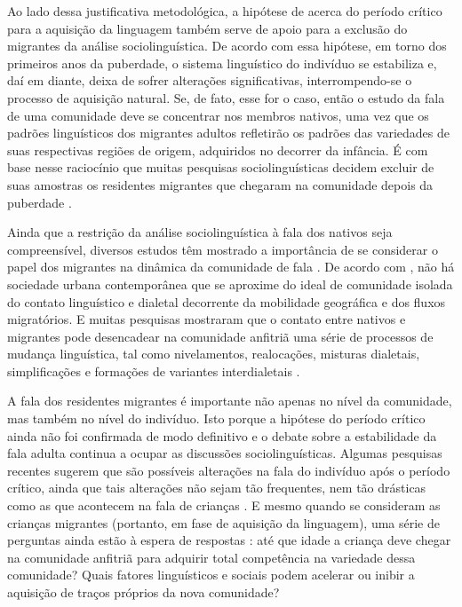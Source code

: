 \documentclass[
    a4paper,	%
    12pt,	%
    ]{article}	%
\begin{document}
Ao lado dessa justificativa metodológica, a hipótese de \citet{Lenneberg1967}
acerca do período crítico para a aquisição da linguagem também serve de apoio
para a exclusão do migrantes da análise sociolinguística. De acordo com essa
hipótese, em torno dos primeiros anos da puberdade, o sistema linguístico do
indivíduo se estabiliza e, daí em diante, deixa de sofrer alterações
significativas, interrompendo-se o processo de aquisição natural. Se, de fato,
esse for o caso, então o estudo da fala de uma comunidade deve se concentrar nos
membros nativos, uma vez que os padrões linguísticos dos migrantes adultos
refletirão os padrões das variedades de suas respectivas regiões de origem,
adquiridos no decorrer da infância. É com base nesse raciocínio que muitas
pesquisas sociolinguísticas decidem excluir de suas amostras os residentes
migrantes que chegaram na comunidade depois da puberdade \citep[p. ex.][p.
111]{Labov1966}.

Ainda que a restrição da análise sociolinguística à fala dos nativos seja
compreensível, diversos estudos têm mostrado a importância de se considerar o
papel dos migrantes na dinâmica da comunidade de fala \citep{Britain2018,
Bortoni-Ricardo2011, Trudgill1986}. De acordo com \citet{Milroy2002}, não há
sociedade urbana contemporânea que se aproxime do ideal de comunidade isolada do
contato linguístico e dialetal decorrente da mobilidade geográfica e dos fluxos
migratórios. E muitas pesquisas mostraram que o contato entre nativos e
migrantes pode desencadear na comunidade anfitriã uma série de processos de
mudança linguística, tal como nivelamentos, realocações, misturas dialetais,
simplificações e formações de variantes interdialetais \citep{Trudgill1986}.

A fala dos residentes migrantes é importante não apenas no nível da comunidade,
mas também no nível do indivíduo. Isto porque a hipótese do período crítico
\citep{Lenneberg1967} ainda não foi confirmada de modo definitivo e o debate
sobre a estabilidade da fala adulta continua a ocupar as discussões
sociolinguísticas. Algumas pesquisas recentes sugerem que são possíveis
alterações na fala do indivíduo após o período crítico, ainda que tais
alterações não sejam tão frequentes, nem tão drásticas como as que acontecem na
fala de crianças \citep{Cukor-Avila.Bailey2013}. E mesmo quando se consideram as
crianças migrantes (portanto, em fase de aquisição da linguagem), uma série de
perguntas ainda estão à espera de respostas \citep{Oushiro2016, Nycz2015,
Chambers1992, Trudgill1986}: até que idade a criança deve chegar na comunidade
anfitriã para adquirir total competência na variedade dessa comunidade? Quais
fatores linguísticos e sociais podem acelerar ou inibir a aquisição de traços
próprios da nova comunidade?
\end{document}
